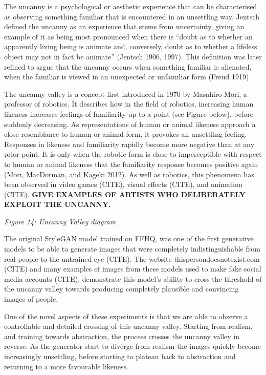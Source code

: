The uncanny is a psychological or aesthetic experience that can be characterised as observing something familiar that is encountered in an unsettling way. 
Jentsch defined the uncanny as an experience that stems from uncertainty, giving an example of it as being most pronounced when there is “doubt as to whether an apparently living being is animate and, conversely, doubt as to whether a lifeless object may not in fact be animate” (Jentsch 1906, 1997). 
This definition was later refined to argue that the uncanny occurs when something familiar is alienated, when the familiar is viewed in an unexpected or unfamiliar form (Freud 1919).

The uncanny valley is a concept first introduced in 1970 by Masahiro Mori, a professor of robotics. 
It describes how in the field of robotics, increasing human likeness increases feelings of familiarity up to a point (see Figure below), before suddenly decreasing. 
As representations of human or animal likeness approach a close resemblance to human or animal form, it provokes an unsettling feeling. 
Responses in likeness and familiarity rapidly become more negative than at any prior point. 
It is only when the robotic form is close to imperceptible with respect to human or animal likeness that the familiarity response becomes positive again (Mori, MacDorman, and Kageki 2012). 
As well as robotics, this phenomena has been observed in video games (CITE), visual effects (CITE), and animation (CITE). 
\textbf{GIVE EXAMPLES OF ARTISTS WHO DELIBERATELY EXPLOIT THE UNCANNY.}

\textit{Figure 14: Uncanny Valley diagram}

The original StyleGAN model trained on FFHQ, was one of the first generative models to be able to generate images that were completely indistinguishable from real people to the untrained eye (CITE). 
The website thispersondoesnotexist.com (CITE) and many examples of images from these models used to make fake social media accounts (CITE), demonstrate this model's ability to cross the threshold of the uncanny valley towards producing completely plausible and convincing images of people.

One of the novel aspects of these experiments is that we are able to observe a controllable and detailed crossing of this uncanny valley. 
Starting from realism, and training towards abstraction, the process crosses the uncanny valley in reverse. 
As the generator start to diverge from realism the images quickly become increasingly unsettling, before starting to plateau back to abstraction and returning to a more favourable likeness.

